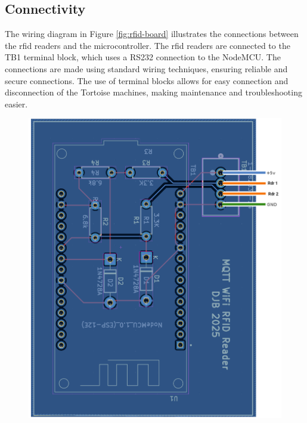 \subsection{Connectivity}
The wiring diagram in Figure \ref{fig:rfid-board} illustrates the connections between the \gls{rfid} readers and the microcontroller. The \gls{rfid} readers are connected to the TB1 terminal block, which uses a RS232 connection to the NodeMCU.
The connections are made using standard wiring techniques, ensuring reliable and secure connections. The use of terminal blocks allows for easy connection and disconnection of the Tortoise machines, making maintenance and troubleshooting easier.
\begin{figure}[H]
  \centering
    \includegraphics[scale=0.2]{../Images/rfid-board.png}\hfill

\end{figure}
